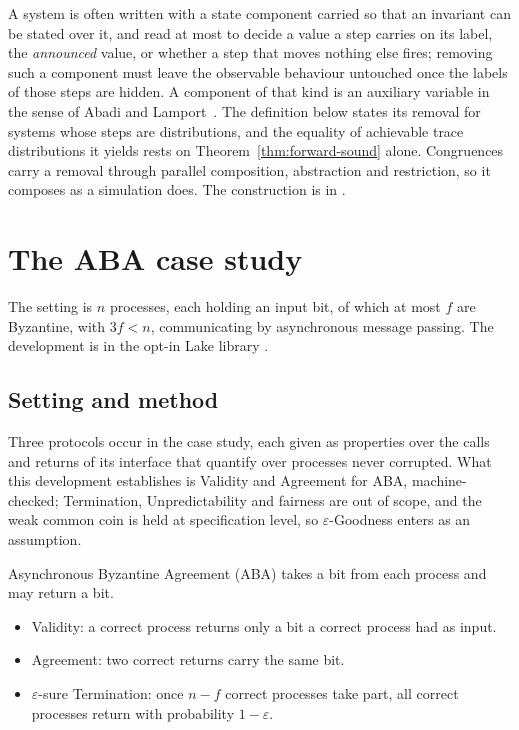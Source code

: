 A system is often written with a state component carried so that an invariant can be stated over it, and read at most to decide a value a step carries on its label, the \emph{announced} value, or whether a step that moves nothing else fires; removing such a component must leave the observable behaviour untouched once the labels of those steps are hidden.
A component of that kind is an auxiliary variable in the sense of Abadi and Lamport~\cite{AL91}.
The definition below states its removal for systems whose steps are distributions, and the equality of achievable trace distributions it yields rests on Theorem~\ref{thm:forward-sound} alone.
Congruences carry a removal through parallel composition, abstraction and restriction, so it composes as a simulation does.
The construction is in .



\chapter{The ABA case study}

The setting is $n$ processes, each holding an input bit, of which at most $f$ are Byzantine, with $3f < n$, communicating by asynchronous message passing.
The development is in the opt-in Lake library .

\section{Setting and method}

Three protocols occur in the case study, each given as properties over the calls and returns of its interface that quantify over processes never corrupted.
What this development establishes is Validity and Agreement for ABA, machine-checked; Termination, Unpredictability and fairness are out of scope, and the weak common coin is held at specification level, so $\varepsilon$-Goodness enters as an assumption.

Asynchronous Byzantine Agreement (ABA) takes a bit from each process and may return a bit.
\begin{itemize}
  \item Validity: a correct process returns only a bit a correct process had as input.
  \item Agreement: two correct returns carry the same bit.
  \item $\varepsilon$-sure Termination: once $n-f$ correct processes take part, all correct processes return with probability $1-\varepsilon$.
\end{itemize}

